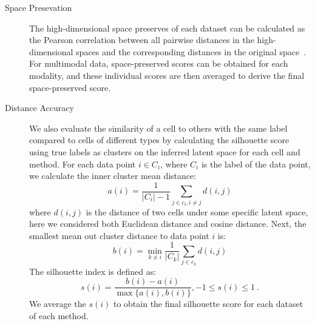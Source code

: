 \begin{description} %
	\item[Space Presevation] The high-dimensional space preserves of each dataset can be calculated as the Pearson correlation between all pairwise distances in the high-dimensional spaces and the corresponding distances in the original space~\citep{jain2021multimap}. For multimodal data, space-preserved scores can be obtained for each modality, and these individual scores are then averaged to derive the final space-preserved score.


	\item[Distance Accuracy] 
    We also evaluate the similarity of a cell to others with the same label compared to cells of different types by calculating the silhouette score~\citep{rousseeuw1987silhouettes} using true labels as clusters on the inferred latent space for each cell and method. For each data point $i\in C_i$, where $C_i$ is the label of the data point, we calculate the inner cluster mean distance:
	\begin{equation}
	  a(i) = \frac{1}{|C_i| - 1} \underset{j \in c_i, i\neq j}{\sum} d(i, j)
	\end{equation}
	where $d(i,j)$ is the distance of two cells under some specific latent space, here we considered both Euclidean distance and cosine distance. Next, the smallest mean out cluster distance to data point $i$ is:
	\begin{equation}
	b(i) = \underset{k\neq i}{\min}\frac{1}{|C_k|}\underset{j\in c_k}{\sum} d(i,j)
	\end{equation}
    The silhouette index is defined as:
	\begin{equation}
	s(i)=\frac{b(i)-a(i)}{\max\{a(i), b(i)\}}, -1\leq s(i) \leq 1\ .
	\end{equation}
    We average the $s(i)$ to obtain the final silhouette score for each dataset of each method.


\end{description}
